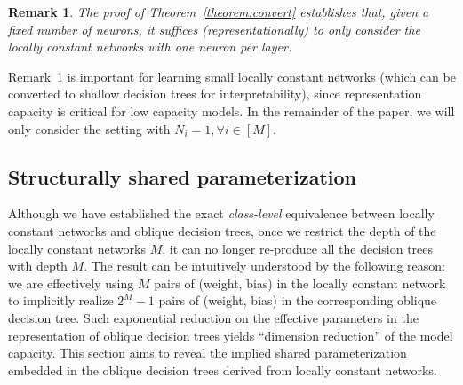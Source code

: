 \documentclass{article} \usepackage{iclr2020_conference,times}
\newtheorem{remark}[theorem]{Remark}
\begin{document}
\begin{remark}
The proof of Theorem~\ref{theorem:convert} establishes that, given a fixed number of neurons, it suffices (representationally) to only consider the locally constant networks with one neuron per layer. 
\label{remark:one-neuron}
\end{remark}
\vspace{-1mm}
Remark~\ref{remark:one-neuron} is important for learning small locally constant networks (which can be converted to shallow decision trees for interpretability), since representation capacity is critical for low capacity models. In the remainder of the paper, we will only consider the setting with $N_i = 1, \forall i \in [M]$.
















































 \vspace{-1mm}
\subsection{Structurally shared parameterization}\label{sec:inductive-bias}

Although we have established the exact \emph{class-level} equivalence between locally constant networks and oblique decision trees, once we restrict the depth of the locally constant networks $M$, it can no longer re-produce all the decision trees with depth $M$. The result can be intuitively understood by the following reason: we are effectively using $M$ pairs of (weight, bias) in the locally constant network to implicitly realize $2^{M}-1$ pairs of (weight, bias) in the corresponding oblique decision tree. Such exponential reduction on the effective parameters in the representation of oblique decision trees yields ``dimension reduction'' of the model capacity. This section aims to reveal the implied shared parameterization embedded in the oblique decision trees derived from locally constant networks.
\end{document}
